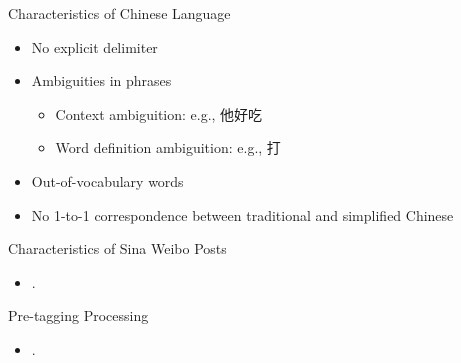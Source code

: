 \documentclass[12pt, trans]{beamer}
\newcommand{\1}[1]{{\mathbf 1}\left\{#1\right\}}        %
\begin{document}
\begin{frame}{Characteristics of Chinese Language}

\begin{itemize}[<+->]
\item No explicit delimiter
\item Ambiguities in phrases
	\begin{itemize}
	\item Context ambiguition: e.g., 他好吃
	\item Word definition ambiguition: e.g., 打
	\end{itemize}
\item Out-of-vocabulary words
\item No 1-to-1 correspondence between traditional and simplified Chinese
\end{itemize}

\end{frame}


\begin{frame}{Characteristics of Sina Weibo Posts}


\begin{itemize}[<+->]
\item  .
\end{itemize}

\end{frame}

\begin{frame}{Pre-tagging Processing}

\begin{itemize}[<+->]
\item  .
\end{itemize}

\end{frame}
\end{document}
